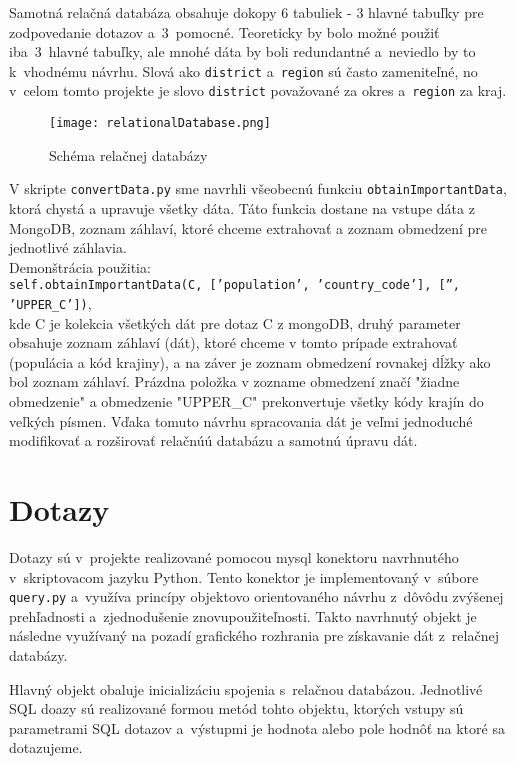 \documentclass [11pt, a4paper]{article}
\begin{document}
Samotná relačná databáza obsahuje dokopy 6 tabuliek - 3 hlavné tabuľky pre zodpovedanie dotazov a~3~pomocné. Teoreticky by bolo možné použiť iba~3~hlavné tabuľky, ale mnohé dáta by boli redundantné a~neviedlo by to k~vhodnému návrhu. Slová ako \texttt{district} a~\texttt{region} sú často zameniteľné, no v~celom tomto projekte je slovo \texttt{district} považované za okres a~\texttt{region} za kraj.

\begin{figure}[H]
\begin{center}
\texttt{[image: relationalDatabase.png]}
\caption{Schéma relačnej databázy}
\end{center}
\end{figure}

V skripte \texttt{convertData.py} sme navrhli všeobecnú funkciu \texttt{obtainImportantData}, ktorá chystá a upravuje všetky dáta. Táto funkcia dostane na vstupe dáta z MongoDB, zoznam záhlaví, ktoré chceme extrahovať a zoznam obmedzení pre jednotlivé záhlavia.\\

Demonštrácia použitia:\\
\texttt{self.obtainImportantData(C, ['population', 'country\_code'], ['', 'UPPER\_C'])}, \\kde C je kolekcia všetkých dát pre dotaz C z mongoDB, druhý parameter obsahuje zoznam záhlaví (dát), ktoré chceme v tomto prípade extrahovať (populácia a kód krajiny), a na záver je zoznam obmedzení rovnakej dĺžky ako bol zoznam záhlaví. Prázdna položka v zozname obmedzení značí "žiadne obmedzenie" a obmedzenie "UPPER\_C" prekonvertuje všetky kódy krajín do veľkých písmen. Vďaka tomuto návrhu spracovania dát je veľmi jednoduché modifikovať a rozširovať relačnúú databázu a samotnú úpravu dát.

\section*{Dotazy}
Dotazy sú v~projekte realizované pomocou mysql konektoru navrhnutého v~skriptovacom jazyku Python. Tento konektor je implementovaný v~súbore \texttt{query.py} a~využíva princípy objektovo orientovaného návrhu z~dôvôdu zvýšenej prehľadnosti a~zjednodušenie znovupoužiteľnosti. Takto navrhnutý objekt je následne využívaný na pozadí grafického rozhrania pre získavanie dát z~relačnej databázy.

Hlavný objekt obaluje inicializáciu spojenia s~relačnou databázou. Jednotlivé SQL doazy sú realizované formou metód tohto objektu, ktorých vstupy sú parametrami SQL dotazov a~výstupmi je hodnota alebo pole hodnôť na ktoré sa dotazujeme.
\end{document}
